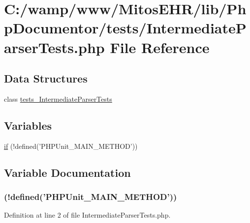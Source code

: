 \hypertarget{_intermediate_parser_tests_8php}{\section{\-C\-:/wamp/www/\-Mitos\-E\-H\-R/lib/\-Php\-Documentor/tests/\-Intermediate\-Parser\-Tests.php \-File \-Reference}
\label{_intermediate_parser_tests_8php}
}
\subsection*{\-Data \-Structures}
\begin{DoxyCompactItemize}
\item 
class \hyperlink{classtests___intermediate_parser_tests}{tests\-\_\-\-Intermediate\-Parser\-Tests}
\end{DoxyCompactItemize}
\subsection*{\-Variables}
\begin{DoxyCompactItemize}
\item 
\hyperlink{_intermediate_parser_tests_8php_a3120764b3588ecfc55f4be599e83d6f9}{if} (!defined('\-P\-H\-P\-Unit\-\_\-\-M\-A\-I\-N\-\_\-\-M\-E\-T\-H\-O\-D'))
\end{DoxyCompactItemize}


\subsection{\-Variable \-Documentation}
\hypertarget{_intermediate_parser_tests_8php_a3120764b3588ecfc55f4be599e83d6f9}{
\subsubsection[{if}]{(!defined('\-P\-H\-P\-Unit\-\_\-\-M\-A\-I\-N\-\_\-\-M\-E\-T\-H\-O\-D'))}}\label{_intermediate_parser_tests_8php_a3120764b3588ecfc55f4be599e83d6f9}


\-Definition at line 2 of file \-Intermediate\-Parser\-Tests.\-php.

